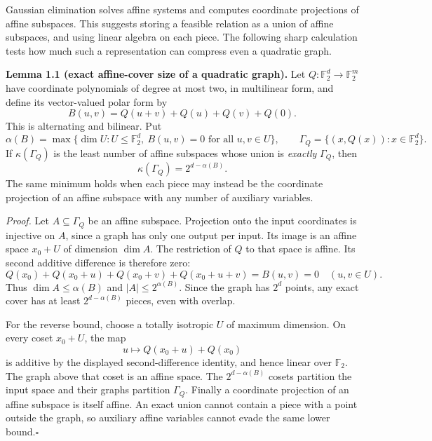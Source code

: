 \documentclass[11pt]{article}
\newcommand{\F}{\mathbb{F}}
\begin{document}
Gaussian elimination solves affine systems and computes coordinate projections
of affine subspaces. This suggests storing a feasible relation as a union of
affine subspaces, and using linear algebra on each piece. The following sharp
calculation tests how much such a representation can compress even a quadratic
graph.

\medskip
\textbf{Lemma 1.1 (exact affine-cover size of a quadratic graph).}
Let $Q:\F_2^d\to\F_2^m$ have coordinate polynomials of degree at most two, in
multilinear form, and define its vector-valued polar form by
\[
 B(u,v)=Q(u+v)+Q(u)+Q(v)+Q(0).
\]
This is alternating and bilinear. Put
\[
 \alpha(B)=\max\{\dim U:U\le\F_2^d,\ B(u,v)=0\text{ for all }u,v\in U\},
 \qquad \Gamma_Q=\{(x,Q(x)):x\in\F_2^d\}.
\]
If $\kappa(\Gamma_Q)$ is the least number of affine subspaces whose union is
\emph{exactly} $\Gamma_Q$, then
\begin{equation}\label{ra:statement:cover}
             \kappa(\Gamma_Q)=2^{d-\alpha(B)}.
\end{equation}
The same minimum holds when each piece may instead be the coordinate
projection of an affine subspace with any number of auxiliary variables.

\emph{Proof.}
Let $A\subseteq\Gamma_Q$ be an affine subspace. Projection onto the input
coordinates is injective on $A$, since a graph has only one output per input.
Its image is an affine space $x_0+U$ of dimension $\dim A$. The restriction of
$Q$ to that space is affine. Its second additive difference is therefore zero:
\[
 Q(x_0)+Q(x_0+u)+Q(x_0+v)+Q(x_0+u+v)=B(u,v)=0
 \quad(u,v\in U).
\]
Thus $\dim A\le\alpha(B)$ and $|A|\le2^{\alpha(B)}$. Since the graph has $2^d$
points, any exact cover has at least $2^{d-\alpha(B)}$ pieces, even with overlap.

For the reverse bound, choose a totally isotropic $U$ of maximum dimension.
On every coset $x_0+U$, the map
\[
 u\longmapsto Q(x_0+u)+Q(x_0)
\]
is additive by the displayed second-difference identity, and hence linear over
$\F_2$. The graph above that coset is an affine space. The $2^{d-\alpha(B)}$
cosets partition the input space and their graphs partition $\Gamma_Q$.
Finally a coordinate projection of an affine subspace is itself affine.
An exact union cannot contain a piece with a point outside the graph, so
auxiliary affine variables cannot evade the same lower bound.\hfill$\square$
\end{document}
